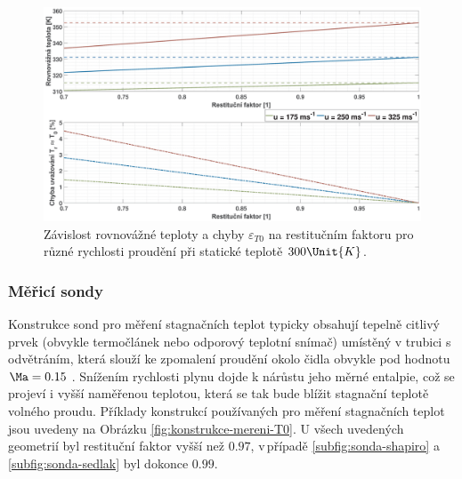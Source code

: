             \begin{figure}[ht!]
                \centering
                \includegraphics*[width=\textwidth, trim = {6cm 0cm 6cm 0cm}]{100_MERENI_TEPLOT/chyba_Tr_T0.eps}
                \caption{Závislost rovnovážné teploty a chyby $\varepsilon _{T0}$ na restitučním faktoru pro různé rychlosti proudění při statické teplotě $300 \Unit{K}$.}
                \label{fig:chyba-Tr-T0}
            \end{figure}

        \subsubsection{Měřicí sondy}
            Konstrukce sond pro měření stagnačních teplot typicky obsahují tepelně citlivý prvek (obvykle termočlánek nebo odporový teplotní snímač) umístěný v trubici \linebreak s\,odvětráním, která slouží ke zpomalení proudění okolo čidla obvykle pod hodnotu \linebreak $\Ma = 0.15$ \cite{Bonham2013}. Snížením rychlosti plynu dojde k nárůstu jeho měrné entalpie, což se projeví i vyšší naměřenou teplotou, která se tak bude blížit stagnační teplotě volného proudu. Příklady konstrukcí používaných pro měření stagnačních teplot jsou uvedeny na Obrázku \ref{fig:konstrukce-mereni-T0}. U všech uvedených geometrií byl restituční faktor vyšší než $0.97$, v\,případě \ref{subfig:sonda-shapiro} a \ref{subfig:sonda-sedlak} byl dokonce $0.99$.

